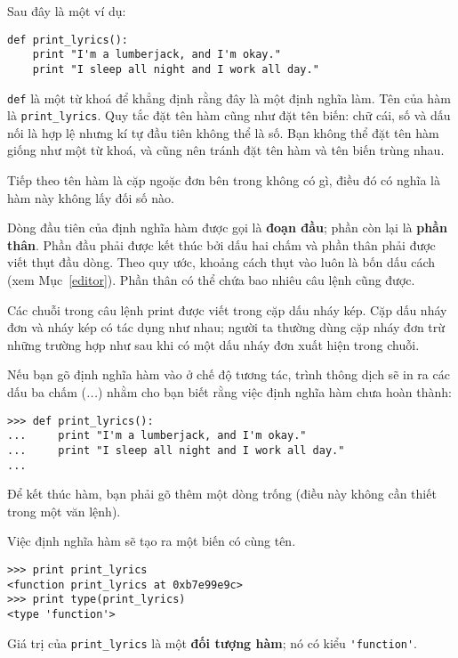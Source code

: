 \documentclass[11pt]{book}
\begin{document}

Sau đây là một ví dụ:

\beforeverb
\begin{verbatim}
def print_lyrics():
    print "I'm a lumberjack, and I'm okay."
    print "I sleep all night and I work all day."
\end{verbatim}
\afterverb
%
{\tt def} là một từ khoá để khẳng định rằng đây là một định nghĩa làm.
Tên của hàm là \verb"print_lyrics". Quy tắc đặt tên hàm cũng như đặt
tên biến: chữ cái, số và dấu nối là hợp lệ nhưng kí tự đầu tiên không
thể là số. Bạn không thể đặt tên hàm giống như một từ khoá, và cũng nên
tránh đặt tên hàm và tên biến trùng nhau.


Tiếp theo tên hàm là cặp ngoặc đơn bên trong không có gì, điều đó
có nghĩa là hàm này không lấy đối số nào.


Dòng đầu tiên của định nghĩa hàm được gọi là {\bf đoạn đầu};
phần còn lại là {\bf phần thân}. Phần đầu phải được kết thúc bởi dấu
hai chấm và phần thân phải được viết thụt đầu dòng. Theo quy ước,
khoảng cách thụt vào luôn là bốn dấu cách (xem Mục~\ref{editor}).
Phần thân có thể chứa bao nhiêu câu lệnh cũng được.

Các chuỗi trong câu lệnh print được viết trong cặp dấu nháy kép.
Cặp dấu nháy đơn và nháy kép có tác dụng như nhau; người ta thường
dùng cặp nháy đơn trừ những trường hợp như sau khi có một dấu
nháy đơn xuất hiện trong chuỗi.


Nếu bạn gõ định nghĩa hàm vào ở chế độ tương tác, trình thông dịch
sẽ in ra các dấu ba chấm ({\em ...}) nhằm cho bạn biết rằng việc
định nghĩa hàm chưa hoàn thành:

\beforeverb
\begin{verbatim}
>>> def print_lyrics():
...     print "I'm a lumberjack, and I'm okay."
...     print "I sleep all night and I work all day."
...
\end{verbatim}
\afterverb
%
Để kết thúc hàm, bạn phải gõ thêm một dòng trống (điều này không
cần thiết trong một văn lệnh).

Việc định nghĩa hàm sẽ tạo ra một biến có cùng tên.

\beforeverb
\begin{verbatim}
>>> print print_lyrics
<function print_lyrics at 0xb7e99e9c>
>>> print type(print_lyrics)
<type 'function'>
\end{verbatim}
\afterverb
%
Giá trị của \verb"print_lyrics" là một {\bf đối tượng hàm}; nó có
kiểu \verb"'function'".
\end{document}

